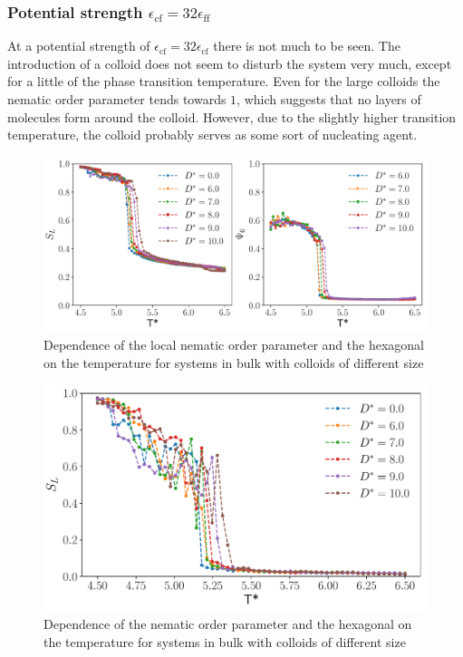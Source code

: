 \subsubsection{Potential strength $\epsilon_{\text{cf}}= 32\epsilon_{\text{ff}}$}
At a potential strength of $\epsilon_{\text{cf}}= 32\epsilon_{\text{cf}}$ there is not much to be seen. The introduction of a colloid does not seem to disturb the system very much, except for a little of the phase transition temperature. Even for the large colloids the nematic order parameter tends towards $1$, which suggests that no layers of molecules form around the colloid. However, due to the slightly higher transition temperature, the colloid probably serves as some sort of nucleating agent. 
\begin{figure}[H]
    \centering
	\includegraphics[width=\linewidth]{plots/bfo_C32_nemhex.pdf}
	\caption{Dependence of the local nematic order parameter and the hexagonal on the temperature for systems in bulk with colloids of different size}
    \label{fig:beoc32lochex}
\end{figure}
\begin{figure}[H]
    \centering
	\includegraphics[width=0.7\linewidth]{plots/bfo_C32_nemsca.pdf}
	\caption{Dependence of the nematic order parameter and the hexagonal on the temperature for systems in bulk with colloids of different size}
    \label{fig:beoc32lochex}
\end{figure}



